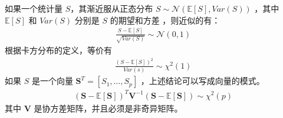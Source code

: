 \documentclass[letterpaper,10pt,english]{sphinxmanual}
\begin{document}
如果一个统计量 \(S\)，其渐近服从正态分布 \(S \sim \mathcal{N}(\mathbb{E}[S],Var(S))\)
，其中 \(\mathbb{E}[S]\) 和 \(Var(S)\) 分别是 \(S\) 的期望和方差
，则近似的有：
\begin{equation}\label{equation:模型评估/influence:模型评估/influence:0}
\begin{split}\frac{S-\mathbb{E}[S]}{\sqrt{Var(S)}} \sim \mathcal{N}(0,1)\end{split}
\end{equation}
根据卡方分布的定义，等价有
\begin{equation}\label{equation:模型评估/influence:模型评估/influence:1}
\begin{split}\frac{(S-\mathbb{E}[S])^2}{Var(s)} \sim \chi^2 (1)\end{split}
\end{equation}
如果 \(S\) 是一个向量 \(\pmb{S}^{T}=[S_1,\dots,S_p]\) ，上述结论可以写成向量的模式。
\begin{equation}\label{equation:模型评估/influence:eq_influence_110}
\begin{split}(\pmb{S}-\mathbb{E}[\pmb{S}])^T \pmb{V}^{-1}(\pmb{S}-\mathbb{E}[\pmb{S}])
\sim \chi^2 (p)\end{split}
\end{equation}
其中 \(\pmb{V}\) 是协方差矩阵，并且必须是非奇异矩阵。
\end{document}
